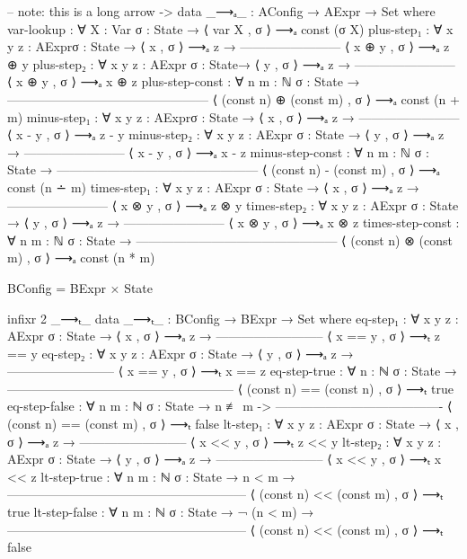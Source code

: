 \documentclass{lecturenotes}
\begin{document}
\begin{code}[hide]
-- note: this is a long arrow \-->
data _⟶ₐ_ : AConfig → AExpr → Set where
  var-lookup : ∀ {X : Var} {σ : State} →
    ⟨ var X , σ ⟩ ⟶ₐ const (σ X)
  plus-step₁ : ∀ {x y z : AExpr}{σ : State} →
         ⟨ x , σ ⟩ ⟶ₐ z →
    ------------------------
     ⟨ x ⊕ y , σ ⟩ ⟶ₐ z ⊕ y
  plus-step₂ : ∀ {x y z : AExpr} {σ : State}→
         ⟨ y , σ ⟩ ⟶ₐ z →
    ------------------------
     ⟨ x ⊕ y , σ ⟩ ⟶ₐ x ⊕ z
  plus-step-const : ∀ {n m : ℕ} {σ : State} →
    ------------------------------------------------
     ⟨ (const n) ⊕ (const m) , σ ⟩ ⟶ₐ const (n + m)
  minus-step₁ : ∀ {x y z : AExpr}{σ : State} →
         ⟨ x , σ ⟩ ⟶ₐ z →
    ------------------------
     ⟨ x - y , σ ⟩ ⟶ₐ z - y
  minus-step₂ : ∀ {x y z : AExpr} {σ : State} →
         ⟨ y , σ ⟩ ⟶ₐ z →
    ------------------------
     ⟨ x - y , σ ⟩ ⟶ₐ x - z
  minus-step-const : ∀ {n m : ℕ} {σ : State} →
    ------------------------------------------------
     ⟨ (const n) - (const m) , σ ⟩ ⟶ₐ const (n ∸ m) 
  times-step₁ : ∀ {x y z : AExpr} {σ : State} →
         ⟨ x , σ ⟩ ⟶ₐ z →
    ------------------------
     ⟨ x ⊗ y , σ ⟩ ⟶ₐ z ⊗ y
  times-step₂ : ∀ {x y z : AExpr} {σ : State} →
         ⟨ y , σ ⟩ ⟶ₐ z →
    ------------------------
     ⟨ x ⊗ y , σ ⟩ ⟶ₐ x ⊗ z
  times-step-const : ∀ {n m : ℕ} {σ : State} →
    ------------------------------------------------
     ⟨ (const n) ⊗ (const m) , σ ⟩ ⟶ₐ const (n * m)

BConfig = BExpr × State

infixr 2 _⟶ₜ_
data _⟶ₜ_ : BConfig → BExpr → Set where
  eq-step₁ : ∀ {x y z : AExpr} {σ : State} →
          ⟨ x , σ ⟩ ⟶ₐ z → 
    --------------------------
     ⟨ x == y , σ ⟩ ⟶ₜ z == y
  eq-step₂ : ∀ {x y z : AExpr} {σ : State} →
          ⟨ y , σ ⟩ ⟶ₐ z →
    --------------------------
     ⟨ x == y , σ ⟩ ⟶ₜ x == z
  eq-step-true : ∀ {n : ℕ} {σ : State} →
    ------------------------------------------------------
     ⟨ (const n) == (const n) , σ ⟩ ⟶ₜ true
  eq-step-false : ∀ {n m : ℕ} {σ : State} →
                    n ≢ m ->
    ----------------------------------------
    ⟨ (const n) == (const m) , σ ⟩ ⟶ₜ false
  lt-step₁ : ∀ {x y z : AExpr} {σ : State} →
          ⟨ x , σ ⟩ ⟶ₐ z →
    --------------------------
     ⟨ x << y , σ ⟩ ⟶ₜ z << y 
  lt-step₂ : ∀ {x y z : AExpr} {σ : State} →
          ⟨ y , σ ⟩ ⟶ₐ z →
    --------------------------
     ⟨ x << y , σ ⟩ ⟶ₜ x << z
  lt-step-true : ∀ {n m : ℕ} {σ : State} →
                                  n < m →
    ---------------------------------------------------------
     ⟨ (const n) << (const m) , σ ⟩ ⟶ₜ true
  lt-step-false : ∀ {n m : ℕ} {σ : State} →
                                 ¬ (n < m) → 
    ---------------------------------------------------------
     ⟨ (const n) << (const m) , σ ⟩ ⟶ₜ false


\end{code}
\end{document}
